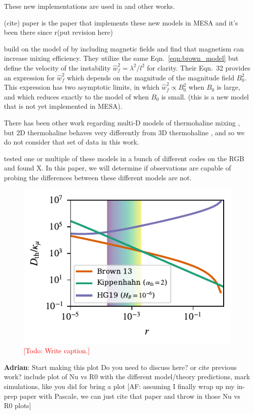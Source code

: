 These new implementations are used in \citep{bauer_bildsten_2019} and other works.

(cite) paper is the paper that implements these new models in MESA and it's been there since r(put revision here)


\citet{harrington} build on the model of \citet{brown_etal_2013} by including magnetic fields and find that magnetism can increase mixing efficiency.
They utilize the same Eqn.~\ref{eqn:brown_model} but define the velocity of the instability $\hat{w}_f^2 = \lambda^2/l^2$ for clarity. 
Their Eqn.~32 provides an expression for $\hat{w}_f^2$ which depends on the magnitude of the magnitude field $B_0^2$.
This expression has two asymptotic limits, in which $\hat{w}_f^2 \propto B_0^2$ when $B_0$ is large, and which reduces exactly to the model of \citet{brown_etal_2013} when $B_0$ is small.
(this is a new model that is not yet implemented in MESA).


There has been other work regarding multi-D models of thermohaline mixing \citep{denissenkov_2010, denissenkov_merryfield_2011}, but 2D thermohaline behaves very differently from 3D thermohaline \citep{garaud_brummell_2015}, and so we do not consider that set of data in this work.

\citet{lattanzio_etal_2015} tested one or multiple of these models in a bunch of different codes on the RGB and found X.
In this paper, we will determine if observations are capable of probing the differences between these different models are not.

\begin{figure}
    \centering
    \includegraphics[width=\columnwidth]{Nu_models_comparison.pdf}
    \caption{\textcolor{red}{[Todo: Write caption.]}}
    \label{fig:parameterization_compare}
\end{figure}

\textbf{Adrian}: Start making this plot
Do you need to discuss here? or cite previous work? include plot of Nu vs R0 with the different model/theory predictions, mark simulations, like you did for bring a plot [AF: assuming I finally wrap up my in-prep paper with Pascale, we can just cite that paper and throw in those Nu vs R0 plots]
